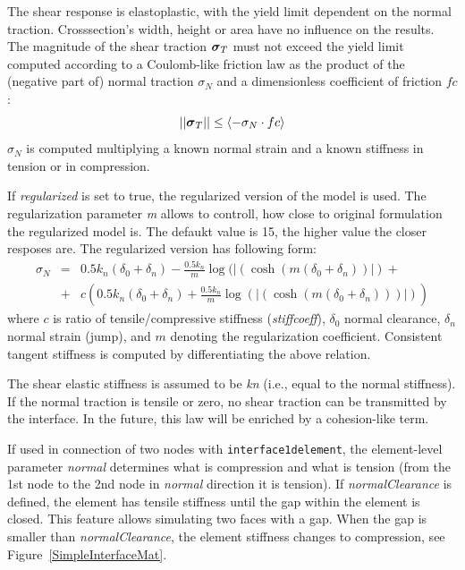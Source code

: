 \documentclass[a4paper]{article}
\newcommand{\mbf}[1]{\mbox{\boldmath$#1$}}
\newcommand{\param}[1]{{\it #1}}
\newcommand{\del}[2]{\mbox{$\displaystyle\frac{#1}{#2}$}}
\newcommand{\vsig}{\mbf{\sigma}}%
\begin{document}
The shear response is elastoplastic, with the yield limit dependent on the normal traction. Crosssection's width, height or area have no influence on the results.
The magnitude of the shear traction $\vsig_T$ must not exceed the yield limit computed 
according to a Coulomb-like friction law as the product of the (negative part of)
 normal traction $\sigma_N$ and a dimensionless coefficient of friction $fc$:
\begin{equation}
    ||\vsig_T|| \leq \left\langle-\sigma_N\cdot fc\right\rangle 
\end{equation}
$\sigma_N$ is computed multiplying a known normal strain and a known stiffness in 
tension or in compression.

If \param{regularized} is set to true, the regularized version of the model is used. The regularization parameter \param{m} allows to controll, how close to original formulation the  regularized model is. The defaukt value is 15, the higher value the closer resposes are. The regularized version has following form:
\begin{eqnarray}
\sigma_N &=& 0.5 k_n(\delta_0+\delta_n)-
            \del{0.5 k_n}{m}\log(|(\cosh(m(\delta_0+\delta_n))|)+\\
         &+&c\left(0.5 k_n(\delta_0+\delta_n)+
            \del{0.5 k_n}{m}\log(|(\cosh(m(\delta_0+\delta_n)))|)\right)
\end{eqnarray}
where $c$ is ratio of tensile/compressive stiffness (\param{stiffcoeff}), $\delta_0$ normal clearance, $\delta_n$ normal strain (jump), and $m$ denoting the regularization coefficient. Consistent tangent stiffness is computed by differentiating the above relation.

The shear elastic stiffness is assumed to be \param{kn} (i.e., equal to the
normal stiffness). If the normal traction is tensile
or zero, no shear traction can be transmitted by the interface.
In the future, this law will be enriched by a cohesion-like term.

If used in connection of two nodes with {\tt interface1delement}, the element-level parameter \param{normal} determines what is compression and what is tension (from the 1st node to the 2nd node in \param{normal} direction it is tension). If \param{normalClearance} is defined, the element has tensile stiffness until the gap within the element is closed. This feature allows simulating two faces with a gap. When the gap is smaller than \param{normalClearance}, the element stiffness changes to compression, see Figure~\ref{SimpleInterfaceMat}. 
\end{document}
